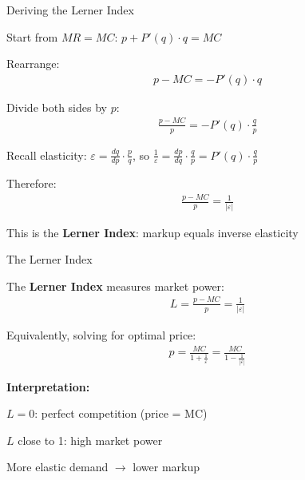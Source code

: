 \documentclass[notes,11pt, aspectratio=169]{beamer}
\newenvironment{wideitemize}{\itemize\addtolength{\itemsep}{10pt}}{\enditemize}
\begin{document}
\begin{frame}{Deriving the Lerner Index}
	\begin{wideitemize}
		\item Start from $MR = MC$: \quad $p + P'(q) \cdot q = MC$
		\item Rearrange:
		\begin{align*}
			p - MC = -P'(q) \cdot q
		\end{align*}
		\item Divide both sides by $p$:
		\begin{align*}
			\frac{p - MC}{p} = -P'(q) \cdot \frac{q}{p}
		\end{align*}
		\item Recall elasticity: $\varepsilon = \frac{dq}{dp} \cdot \frac{p}{q}$, so $\frac{1}{\varepsilon} = \frac{dp}{dq} \cdot \frac{q}{p} = P'(q) \cdot \frac{q}{p}$
		\item Therefore:
		\begin{align*}
			\boxed{\frac{p - MC}{p} = \frac{1}{|\varepsilon|}}
		\end{align*}
		\item This is the \textbf{Lerner Index}: markup equals inverse elasticity
	\end{wideitemize}
\end{frame}

\begin{frame}{The Lerner Index}
	\begin{wideitemize}
		\item The \textbf{Lerner Index} measures market power:
		\begin{align*}
			L = \frac{p - MC}{p} = \frac{1}{|\varepsilon|}
		\end{align*}
		\item Equivalently, solving for optimal price:
		\begin{align*}
			p = \frac{MC}{1 + \frac{1}{\varepsilon}} = \frac{MC}{1 - \frac{1}{|\varepsilon|}}
		\end{align*}
		\item \textbf{Interpretation:}
		\begin{wideitemize}
			\vspace{5pt}
			\item $L = 0$: perfect competition (price = MC)
			\item $L$ close to 1: high market power
			\item More elastic demand $\rightarrow$ lower markup
		\end{wideitemize}
	\end{wideitemize}
\end{frame}
\end{document}
